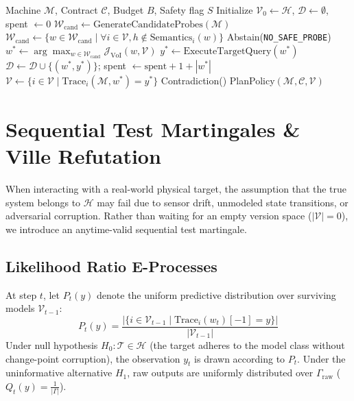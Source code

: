 \documentclass[10pt,twocolumn,letterpaper]{article}
\begin{document}
\begin{algorithm}[t]
\caption{Model-Safe VoI Active Calibration}
\label{alg:voi}
\begin{algorithmic}[1]
\Require Machine $\mathcal{M}$, Contract $\mathcal{C}$, Budget $B$, Safety flag $S$
\State Initialize $\mathcal{V}_0 \leftarrow \mathcal{H}$, $\mathcal{D} \leftarrow \emptyset$, spent $\leftarrow 0$
    \State $\mathcal{W}_{\text{cand}} \leftarrow \text{GenerateCandidateProbes}(\mathcal{M})$
        \State $\mathcal{W}_{\text{cand}} \leftarrow \{ w \in \mathcal{W}_{\text{cand}} \mid \forall i \in \mathcal{V}, h \notin \text{Semantics}_i(w) \}$
    \EndIf
     \Return Abstain(\texttt{NO\_SAFE\_PROBE}) \EndIf
    \State $w^* \leftarrow \arg\max_{w \in \mathcal{W}_{\text{cand}}} \mathcal{J}_{\text{VoI}}(w, \mathcal{V})$
    \State $y^* \leftarrow \text{ExecuteTargetQuery}(w^*)$
    \State $\mathcal{D} \leftarrow \mathcal{D} \cup \{(w^*, y^*)\}$; \quad spent $\leftarrow \text{spent} + 1 + |w^*|$
    \State $\mathcal{V} \leftarrow \{ i \in \mathcal{V} \mid \text{Trace}_i(\mathcal{M}, w^*) = y^* \}$
     \Return Contradiction() \EndIf
\EndWhile
\State \Return PlanPolicy$(\mathcal{M}, \mathcal{C}, \mathcal{V})$
\end{algorithmic}
\end{algorithm}

\section{Sequential Test Martingales \& Ville Refutation}
\label{sec:martingale}

When interacting with a real-world physical target, the assumption that the true system belongs to $\mathcal{H}$ may fail due to sensor drift, unmodeled state transitions, or adversarial corruption. Rather than waiting for an empty version space ($|\mathcal{V}| = 0$), we introduce an anytime-valid sequential test martingale.

\subsection{Likelihood Ratio E-Processes}
At step $t$, let $P_t(y)$ denote the uniform predictive distribution over surviving models $\mathcal{V}_{t-1}$:
\begin{equation}
    P_t(y) = \frac{|\{ i \in \mathcal{V}_{t-1} \mid \text{Trace}_i(w_t)[-1] = y \}|}{|\mathcal{V}_{t-1}|}
\end{equation}
Under null hypothesis $H_0: \mathcal{T} \in \mathcal{H}$ (the target adheres to the model class without change-point corruption), the observation $y_t$ is drawn according to $P_t$.
Under the uninformative alternative $H_1$, raw outputs are uniformly distributed over $\Gamma_{\text{raw}}$ ($Q_t(y) = \frac{1}{|\Gamma|}$).
\end{document}
